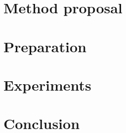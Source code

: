 \documentclass[runningheads]{llncs}
\begin{document}
\section{Method proposal}


\section{Preparation}


\section{Experiments}


\section{Conclusion}




\end{document}
